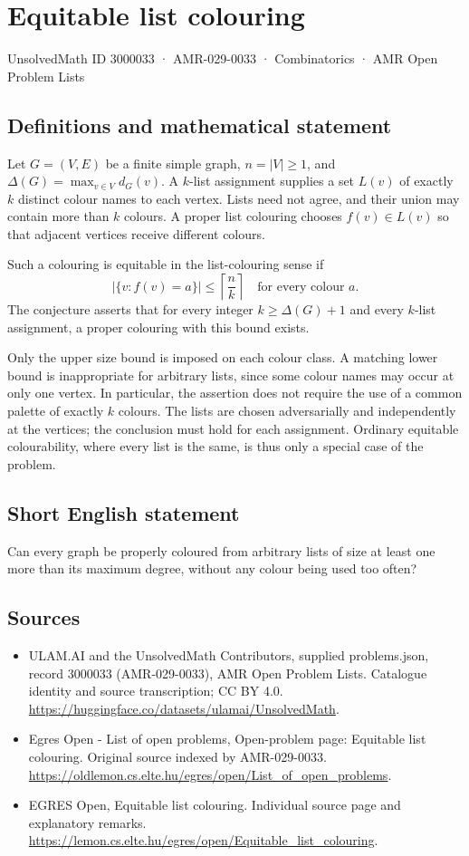 \documentclass[11pt,a4paper]{article}
\begin{document}
\section*{Equitable list colouring}\label{3000033}
{\small UnsolvedMath ID 3000033 · AMR-029-0033 · Combinatorics · AMR Open Problem Lists}
\subsection{Definitions and mathematical statement}
Let $G=(V,E)$ be a finite simple graph, $n=|V|\ge1$, and
$\Delta(G)=\max_{v\in V}d_G(v)$. A $k$-list assignment supplies a set
$L(v)$ of exactly $k$ distinct colour names to each vertex. Lists
need not agree, and their union may contain more than $k$ colours.
A proper list colouring chooses $f(v)\in L(v)$ so that adjacent
vertices receive different colours.

Such a colouring is equitable in the list-colouring sense if
\[
                       |\{v:f(v)=a\}|\le\left\lceil\frac nk\right\rceil
                                      \quad\text{for every colour }a.
\]
The conjecture asserts that for every integer $k\ge\Delta(G)+1$ and
every $k$-list assignment, a proper colouring with this bound exists.

Only the upper size bound is imposed on each colour class. A matching
lower bound is inappropriate for arbitrary lists, since some colour
names may occur at only one vertex. In particular, the assertion does
not require the use of a common palette of exactly $k$ colours.
The lists are chosen adversarially and independently at the vertices;
the conclusion must hold for each assignment. Ordinary equitable
colourability, where every list is the same, is thus only a special
case of the problem.
\subsection{Short English statement}
Can every graph be properly coloured from arbitrary lists of
size at least one more than its maximum degree, without any colour being used too often?
\subsection{Sources}
\begin{itemize}
\item[S1] ULAM.AI and the UnsolvedMath Contributors, supplied problems.json, record 3000033 (AMR-029-0033), AMR Open Problem Lists. Catalogue identity and source transcription; CC BY 4.0.
\url{https://huggingface.co/datasets/ulamai/UnsolvedMath}.
\item[S2] Egres Open - List of open problems, Open-problem page: Equitable list colouring. Original source indexed by AMR-029-0033.
\url{https://oldlemon.cs.elte.hu/egres/open/List_of_open_problems}.
\item[S3] EGRES Open, Equitable list colouring. Individual source page and explanatory remarks.
\url{https://lemon.cs.elte.hu/egres/open/Equitable_list_colouring}.
\end{itemize}
\end{document}
